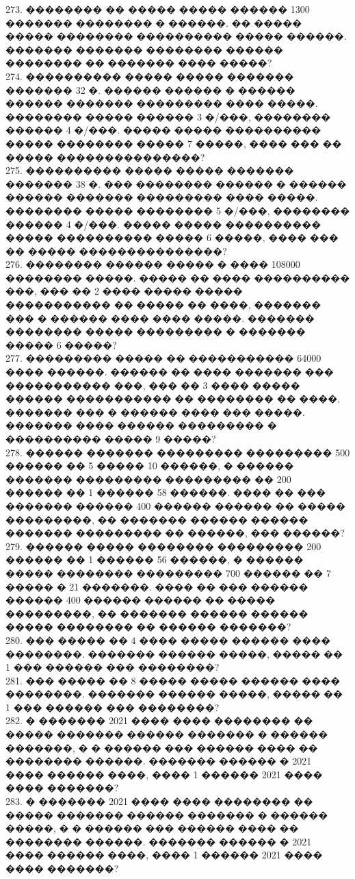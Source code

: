 \documentclass[12pt]{article}
\begin{document}
273. �������� �� ����� ����� ������ 1300 ������� �������� � ������. �� ����� ����� �������� ���������� ����� ������. ������� ������� �������� ������ �������� �� ������� ���� �����?\\
274. ���������� ����� ����� ������� ������� 32 �. ������ ������ � ������ ������ ������� ��������� ���� �����. �������� ����� ������ 3 �/���, �������� ������ 4 �/���. ����� ����� ���������� ����� �������� ����� 7 �����, ���� ��� �� ����� ���������������?\\
275. ���������� ����� ����� ������� ������� 38 �. ��� �������� ������ � ������ ������ ������� ��������� ���� �����. �������� ����� �������� 5 �/���, �������� ������ 4 �/���. ����� ����� ���������� ����� ���������� ����� 6 �����, ���� ��� �� ����� ���������������?\\
276. �������� ������ ����� � ���� 108000 �������� �����. ����� �� ���� ���������� ���, ��� �� 2 ���� ����� ����� ����������� �� ����� �� ����, ������� ��� � ������ ���� ���� �����. ������� �������� ����� ��������� � ������� ����� 6 �����?\\
277. ��������� ����� �� ����������� 64000 ���� ������. ������ �� ���� ������� ��� ����������� ���, ��� �� 3 ���� ����� ������ ����������� �� �������� �� ����, ������� ��� � ������ ���� ��� �����. ������� ���� ������ ��������� � ���������� ����� 9 �����?\\
278. ������ ������� ��������� ��������� 500 ������ �� 5 ����� 10 ������, � ������ ������� ��������� ��������� �� 200 ������ �� 1 ������ 58 ������. ���� �� ��� ������� ������ 400 ������ ������ �� ����� ���������, �� ������� ������ ������ ������� ��������� �� ������, ��� ������?\\
279. ������ ����� �������� ��������� 200 ������ �� 1 ������ 56 ������, � ������ ����� �������� ��������� 700 ������ �� 7 ����� � 21 �������. ���� �� ��� ������ ������ 400 ������ ������ �� ����� ���������, �� ������� ������ ������ ����� �������� �� ������ �������?\\
280. ��� ����� �� 4 ���� ����� ������ ���� ��������. ������� ������ �����, ����� �� 1 ��� ������ ��� ��������?\\
281. ��� ����� �� 8 ����� ����� ������ ���� ��������. ������� ������ �����, ����� �� 1 ��� ������ ��� ��������?\\
282. � ������� 2021 ���� ���� �������� �� ����� ������� ������ ������� � ������ �������, � � ������ ��� ������ ���� �� �������� ������. ������� ������ � 2021 ���� ������ ����, ���� 1 ������ 2021 ���� ���� �������?\\
283. � ������� 2021 ���� ���� �������� �� ����� ������� ������ ������� � ������ �����, � � ������ ��� ������ ���� �� �������� ������. ������� ������ � 2021 ���� ������ ����, ���� 1 ������ 2021 ���� ���� �������?\\
\end{document}
